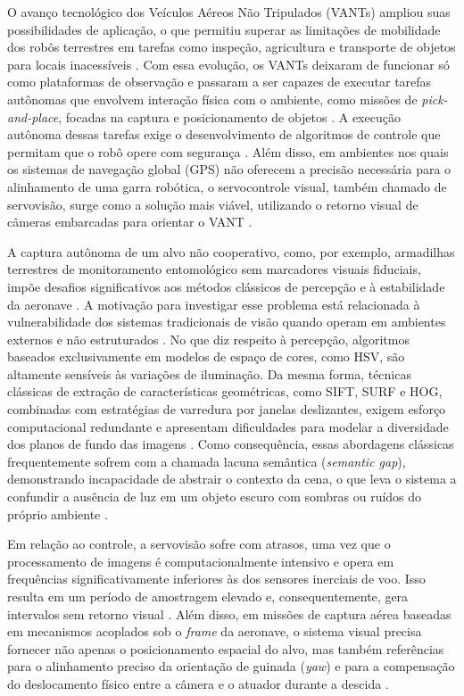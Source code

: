 O avanço tecnológico dos Veículos Aéreos Não Tripulados (VANTs) ampliou suas possibilidades de aplicação, o que permitiu superar as limitações de mobilidade dos robôs terrestres em tarefas como inspeção, agricultura e transporte de objetos para locais inacessíveis \cite{carvajal2024}. Com essa evolução, os VANTs deixaram de funcionar só como plataformas de observação e passaram a ser capazes de executar tarefas autônomas que envolvem interação física com o ambiente, como missões de \textit{pick-and-place}, focadas na captura e posicionamento de objetos \cite{abuzayed2020, cocuzza2021}. A execução autônoma dessas tarefas exige o desenvolvimento de algoritmos de controle que permitam que o robô opere com segurança \cite{carvajal2024}. Além disso, em ambientes nos quais os sistemas de navegação global (GPS) não oferecem a precisão necessária para o alinhamento de uma garra robótica, o servocontrole visual, também chamado de servovisão, surge como a solução mais viável, utilizando o retorno visual de câmeras embarcadas para orientar o VANT \cite{shang2016}.

A captura autônoma de um alvo não cooperativo, como, por exemplo, armadilhas terrestres de monitoramento entomológico sem marcadores visuais fiduciais, impõe desafios significativos aos métodos clássicos de percepção e à estabilidade da aeronave \cite{zhao2019}. A motivação para investigar esse problema está relacionada à vulnerabilidade dos sistemas tradicionais de visão quando operam em ambientes externos e não estruturados \cite{zhao2019}. No que diz respeito à percepção, algoritmos baseados exclusivamente em modelos de espaço de cores, como HSV, são altamente sensíveis às variações de iluminação. Da mesma forma, técnicas clássicas de extração de características geométricas, como SIFT, SURF e HOG, combinadas com estratégias de varredura por janelas deslizantes, exigem esforço computacional redundante e apresentam dificuldades para modelar a diversidade dos planos de fundo das imagens \cite{zhao2019}. Como consequência, essas abordagens clássicas frequentemente sofrem com a chamada lacuna semântica (\textit{semantic gap}), demonstrando incapacidade de abstrair o contexto da cena, o que leva o sistema a confundir a ausência de luz em um objeto escuro com sombras ou ruídos do próprio ambiente \cite{zhao2019}.

Em relação ao controle, a servovisão sofre com atrasos, uma vez que o processamento de imagens é computacionalmente intensivo e opera em frequências significativamente inferiores às dos sensores inerciais de voo. Isso resulta em um período de amostragem elevado e, consequentemente, gera intervalos sem retorno visual \cite{shang2016}. Além disso, em missões de captura aérea baseadas em mecanismos acoplados sob o \textit{frame} da aeronave, o sistema visual precisa fornecer não apenas o posicionamento espacial do alvo, mas também referências para o alinhamento preciso da orientação de guinada (\textit{yaw}) e para a compensação do deslocamento físico entre a câmera e o atuador durante a descida \cite{cocuzza2021, ladig2021}.

